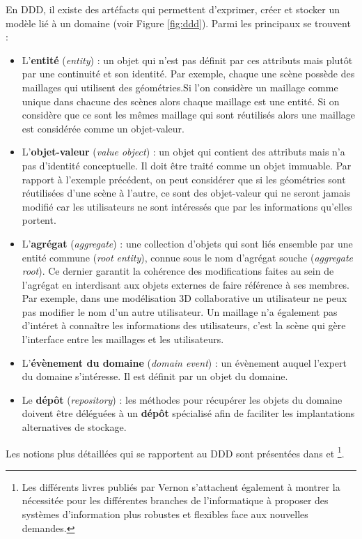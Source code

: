 En \gls{DDD}, il existe des artéfacts qui permettent d'exprimer, créer et stocker un 
modèle lié à un domaine (voir Figure \ref{fig:ddd}). Parmi les principaux se trouvent 
:
\begin{itemize}
	\item L'\textbf{entité} (\textit{entity}) : un objet qui n'est pas définit par ces 
	attributs 
	mais plutôt par une continuité et son identité. 
	Par exemple, chaque une scène possède des maillages qui utilisent des 
	géométries.Si l'on 
	considère un maillage comme unique dans chacune des scènes alors chaque 
	maillage est une entité. Si on considère que ce sont les mêmes maillage qui 
	sont réutilisés alors une maillage est considérée comme un objet-valeur.
	
	\item L'\textbf{objet-valeur} (\textit{value object}) : un objet qui contient des 
	attributs 
	mais n'a pas d'identité conceptuelle. Il doit être traité comme un objet
	immuable. Par rapport à l'exemple précédent, on peut considérer que si les 
	géométries sont réutilisées d'une scène à l'autre, ce sont des objet-valeur qui 
	ne seront jamais modifié car les utilisateurs ne sont intéressés que par les 
	informations qu'elles portent.
	
	\item L'\textbf{agrégat} (\textit{aggregate}) : une collection d'objets qui sont 
	liés 
	ensemble par une entité commune (\textit{root entity}), connue sous le nom 
	d'agrégat souche (\textit{aggregate root}). Ce dernier garantit la cohérence des 
	modifications faites au sein de l'agrégat en interdisant aux objets externes de 
	faire référence à ses membres. Par exemple, dans une modélisation 3D 
	collaborative un utilisateur ne peux pas modifier le nom d'un autre utilisateur. Un 
	maillage n'a également pas d'intéret à connaître les informations des 
	utilisateurs, c'est la scène qui gère l'interface entre les maillages et les 
	utilisateurs.
	\item L'\textbf{évènement du domaine} (\textit{domain event}) : un 
	évènement auquel 
	l'expert du domaine s'intéresse. Il est définit par un objet du domaine.
	\item Le \textbf{dépôt} (\textit{repository}) : les méthodes pour récupérer les 
	objets du domaine doivent être déléguées à un \textbf{dépôt} spécialisé afin de 
	faciliter les implantations 
	alternatives de stockage.
\end{itemize}



Les notions plus détaillées qui se rapportent au \gls{DDD} sont présentées dans 
\cite{Evans2003} et \cite{Vernon2013}\footnote{Les différents livres publiés par 
Vernon s'attachent également à montrer la nécessitée pour les différentes 
branches de l'informatique à proposer des 
systèmes d'information plus robustes et flexibles face aux nouvelles demandes.}.

